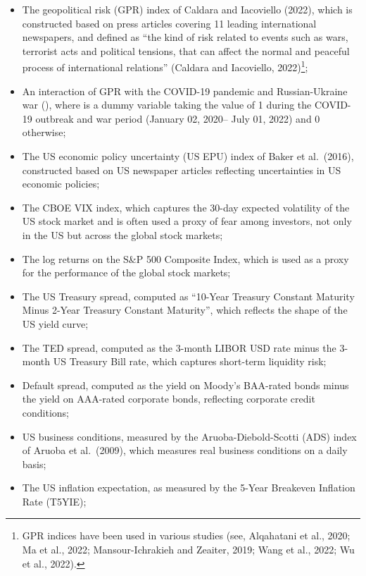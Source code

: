 \documentclass[
  letterpaper,
  DIV=11,
  numbers=noendperiod]{scrartcl}
\providecommand{\tightlist}{%
  \setlength{\itemsep}{0pt}\setlength{\parskip}{0pt}}\usepackage{longtable,booktabs,array}
\begin{document}
\begin{itemize}
\tightlist
\item
  The geopolitical risk (GPR) index of Caldara and Iacoviello (2022),
  which is constructed based on press articles covering 11 leading
  international newspapers, and defined as ``the kind of risk related to
  events such as wars, terrorist acts and political tensions, that can
  affect the normal and peaceful process of international relations''
  (Caldara and Iacoviello, 2022)\footnote{GPR indices have been used in
    various studies (see, Alqahatani et al., 2020; Ma et al., 2022;
    Mansour-Ichrakieh and Zeaiter, 2019; Wang et al., 2022; Wu et al.,
    2022).};
\item
  An interaction of GPR with the COVID-19 pandemic and Russian-Ukraine
  war (), where is a dummy variable taking the value of 1 during the
  COVID-19 outbreak and war period (January 02, 2020-- July 01, 2022)
  and 0 otherwise;
\item
  The US economic policy uncertainty (US EPU) index of Baker et
  al.~(2016), constructed based on US newspaper articles reflecting
  uncertainties in US economic policies;
\item
  The CBOE VIX index, which captures the 30-day expected volatility of
  the US stock market and is often used a proxy of fear among investors,
  not only in the US but across the global stock markets;
\item
  The log returns on the S\&P 500 Composite Index, which is used as a
  proxy for the performance of the global stock markets;
\item
  The US Treasury spread, computed as ``10-Year Treasury Constant
  Maturity Minus 2-Year Treasury Constant Maturity'', which reflects the
  shape of the US yield curve;
\item
  The TED spread, computed as the 3-month LIBOR USD rate minus the
  3-month US Treasury Bill rate, which captures short-term liquidity
  risk;
\item
  Default spread, computed as the yield on Moody's BAA-rated bonds minus
  the yield on AAA-rated corporate bonds, reflecting corporate credit
  conditions;
\item
  US business conditions, measured by the Aruoba-Diebold-Scotti (ADS)
  index of Aruoba et al.~(2009), which measures real business conditions
  on a daily basis;
\item
  The US inflation expectation, as measured by the 5-Year Breakeven
  Inflation Rate (T5YIE);
\end{itemize}
\end{document}
